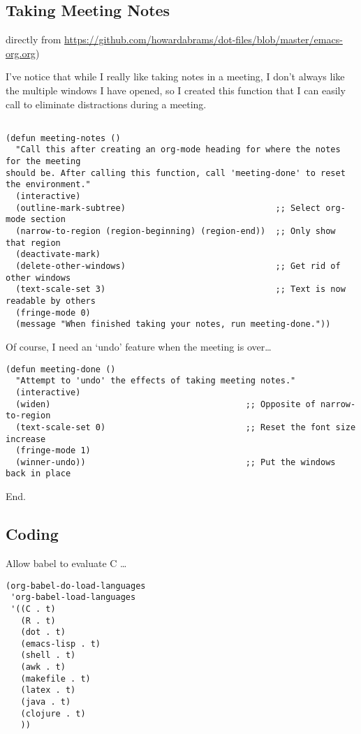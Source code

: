 \documentclass[12pt]{article}
\begin{document}
\subsection{Taking Meeting Notes}
\label{sec:org2cffde1}

directly from \url{https://github.com/howardabrams/dot-files/blob/master/emacs-org.org})

I’ve notice that while I really like taking notes in a meeting, I don’t always like the multiple windows I have opened, so I created this function that I can easily call to eliminate distractions during a meeting.
\begin{verbatim}

(defun meeting-notes ()
  "Call this after creating an org-mode heading for where the notes for the meeting
should be. After calling this function, call 'meeting-done' to reset the environment."
  (interactive)
  (outline-mark-subtree)                              ;; Select org-mode section
  (narrow-to-region (region-beginning) (region-end))  ;; Only show that region
  (deactivate-mark)
  (delete-other-windows)                              ;; Get rid of other windows
  (text-scale-set 3)                                  ;; Text is now readable by others
  (fringe-mode 0)
  (message "When finished taking your notes, run meeting-done."))

\end{verbatim}
Of course, I need an ‘undo’ feature when the meeting is over…
\begin{verbatim}
(defun meeting-done ()
  "Attempt to 'undo' the effects of taking meeting notes."
  (interactive)
  (widen)                                       ;; Opposite of narrow-to-region
  (text-scale-set 0)                            ;; Reset the font size increase
  (fringe-mode 1)
  (winner-undo))                                ;; Put the windows back in place

\end{verbatim}

End.

\subsection{Coding}
\label{sec:org87c399b}

Allow babel to evaluate C \ldots{}

\begin{verbatim}
(org-babel-do-load-languages
 'org-babel-load-languages
 '((C . t)
   (R . t)
   (dot . t)
   (emacs-lisp . t)
   (shell . t)
   (awk . t)
   (makefile . t)
   (latex . t)
   (java . t)
   (clojure . t)
   ))

\end{verbatim}
\end{document}
